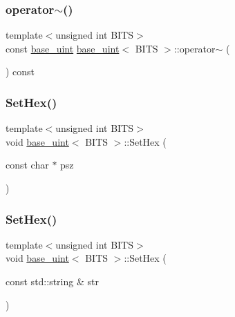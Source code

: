 \subsubsection{\texorpdfstring{operator$\sim$()}{operator~()}}
{\footnotesize\ttfamily template$<$unsigned int B\+I\+TS$>$ \\
const \mbox{\hyperlink{classbase__uint}{base\+\_\+uint}} \mbox{\hyperlink{classbase__uint}{base\+\_\+uint}}$<$ B\+I\+TS $>$\+::operator$\sim$ (\begin{DoxyParamCaption}{ }\end{DoxyParamCaption}) const\hspace{0.3cm}{\ttfamily [inline]}}

\mbox{\label{classbase__uint_ade1a897fac931f28f54998c92c797228}} 
\subsubsection{\texorpdfstring{Set\+Hex()}{SetHex()}\hspace{0.1cm}{\footnotesize\ttfamily [1/2]}}
{\footnotesize\ttfamily template$<$unsigned int B\+I\+TS$>$ \\
void \mbox{\hyperlink{classbase__uint}{base\+\_\+uint}}$<$ B\+I\+TS $>$\+::Set\+Hex (\begin{DoxyParamCaption}\item[{const char $\ast$}]{psz }\end{DoxyParamCaption})}

\mbox{\label{classbase__uint_afe3600e6ae4e9f69e1c036581a2716c8}} 
\subsubsection{\texorpdfstring{Set\+Hex()}{SetHex()}\hspace{0.1cm}{\footnotesize\ttfamily [2/2]}}
{\footnotesize\ttfamily template$<$unsigned int B\+I\+TS$>$ \\
void \mbox{\hyperlink{classbase__uint}{base\+\_\+uint}}$<$ B\+I\+TS $>$\+::Set\+Hex (\begin{DoxyParamCaption}\item[{const std\+::string \&}]{str }\end{DoxyParamCaption})}

